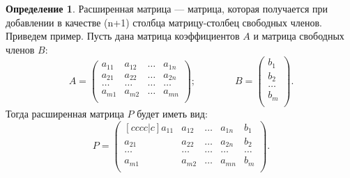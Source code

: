 \documentclass[a5paper, 11pt]{extbook}
\theoremstyle{definition}
\theoremstyle{definition}
\newtheorem{definition}{Определение}[section]
\theoremstyle{definition}
\begin{document}
\begin{definition}
    \label{def:augmented-matrix}
    Расширенная матрица — матрица, которая получается при добавлении в качестве (n+1) столбца матрицу-столбец свободных членов. Приведем пример. Пусть дана матрица коэффициентов \(A\) и матрица свободных членов \(B\):
    \begin{equation*}
        A =
        \begin{pmatrix}
            a_{11} & a_{12} & \ldots & a_{1n} \\
            a_{21} & a_{22} & \ldots & a_{2n} \\
            \ldots & \ldots & \ldots & \ldots \\
            a_{m1} & a_{m2} & \ldots & a_{mn} \\
        \end{pmatrix};
        \qquad \qquad
        B =
        \begin{pmatrix}
            b_1    \\
            b_2    \\
            \ldots \\
            b_m    \\
        \end{pmatrix}.
    \end{equation*}
    Тогда расширенная матрица \(P\) будет иметь вид:
    \begin{equation*}
        P =
        \begin{pmatrix}[cccc|c]
            a_{11} & a_{12} & \ldots & a_{1n} & b_1    \\
            a_{21} & a_{22} & \ldots & a_{2n} & b_2    \\
            \ldots & \ldots & \ldots & \ldots & \ldots \\
            a_{m1} & a_{m2} & \ldots & a_{mn} & b_m    \\
        \end{pmatrix}.
    \end{equation*}
\end{definition}
\end{document}
